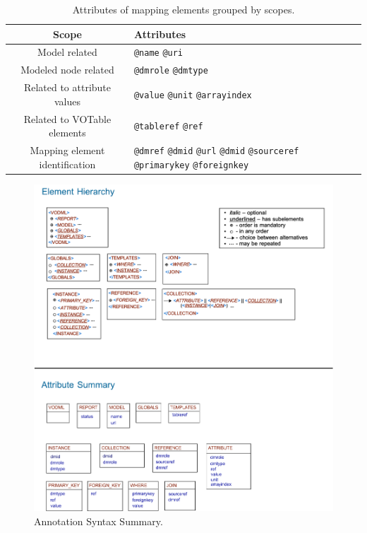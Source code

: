 \begin{table}[!htbp]
\small
\centering
\begin{tabulary}{\linewidth}{|c|J|}       
       \hline 
            \textbf{Scope} & 
            \textbf {Attributes}\\
       \hline         
       \hline  
             Model related & 
             \texttt{@name} \texttt{@uri} \\
       \hline  
             Modeled node related & 
             \texttt{@dmrole} \texttt{@dmtype} \\
       \hline  
             Related to attribute values & 
             \texttt{@value} \texttt{@unit} \texttt{@arrayindex} \\
       \hline  
             Related to VOTable elements & 
             \texttt{@tableref} \texttt{@ref} \\
       \hline  
             Mapping element identification& 
             \texttt{@dmref} \texttt{@dmid} \texttt{@url} \texttt{@dmid} \texttt{@sourceref} \texttt{@primarykey} \texttt{@foreignkey} \\
       \hline
     \end{tabulary}
     \caption{Attributes of mapping elements grouped by scopes.} 
     \label{tbl:syntax-att}
 \end{table}
 
 


  \begin{figure}[h]
    \begin{center}
      \includegraphics[width=1.2\textwidth]{mivot-summary.png}
      \caption{Annotation Syntax Summary.}
      \label{fig:summary}
    \end{center}
  \end{figure}
